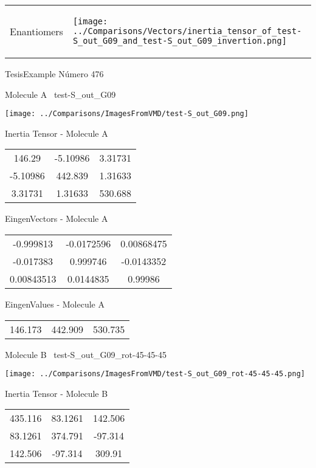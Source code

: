 \vtab[-5mm]
\begin{tabular}{*{2}{m{}}}
\begin{center}
\textcolor{NavyBlue}{\Large Enantiomers}
\end{center}
&
\begin{center}
\texttt{[image: ../Comparisons/Vectors/inertia\_tensor\_of\_test-S\_out\_G09\_and\_test-S\_out\_G09\_invertion.png]}
\end{center}
\end{tabular}

 \newpage

\vtab[-3cm]
\begin{center}
{\large TesisExample \tab Número 476}
\end{center}
\begin{multicols}{2}
\begin{center}

Molecule A \
test-S\_out\_G09

\texttt{[image: ../Comparisons/ImagesFromVMD/test-S\_out\_G09.png]}

Inertia Tensor - Molecule A \\
\begin{tabular}{|c c c|}
146.29	 & 	-5.10986	 & 	3.31731	 \\
-5.10986	 & 	442.839	 & 	1.31633	 \\
3.31731	 & 	1.31633	 & 	530.688
\end{tabular}

\vtab
 EingenVectors - Molecule A     \\
\begin{tabular}{|c c c|}
-0.999813	 & 	-0.0172596	 & 	0.00868475	 \\
-0.017383	 & 	0.999746	 & 	-0.0143352	 \\
0.00843513	 & 	0.0144835	 & 	0.99986
\end{tabular}

\vtab
 EingenValues - Molecule A     \\
\begin{tabular}{|c c c|}
146.173	 & 	442.909	 & 	530.735	 \\
\end{tabular}
\columnbreak

Molecule B \
test-S\_out\_G09\_rot-45-45-45

\texttt{[image: ../Comparisons/ImagesFromVMD/test-S\_out\_G09\_rot-45-45-45.png]}

Inertia Tensor - Molecule B \\
\begin{tabular}{|c c c|}
435.116	 & 	83.1261	 & 	142.506	 \\
83.1261	 & 	374.791	 & 	-97.314	 \\
142.506	 & 	-97.314	 & 	309.91
\end{tabular}


\end{center}
\end{multicols}
